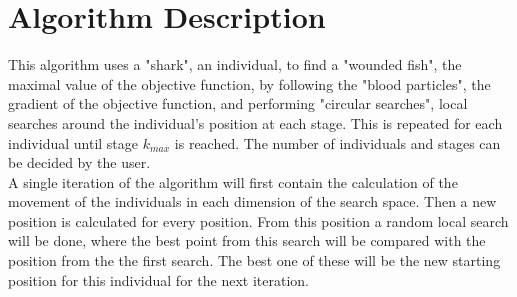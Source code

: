 \documentclass[runningheads]{llncs}
\begin{document}
\section{Algorithm Description} \label{sec:description}
This algorithm uses a "shark", an individual, to find a "wounded fish", the maximal value of the objective function, by following the "blood particles", the gradient of the objective function, and performing "circular searches", local searches around the individual's position at each stage. This is repeated for each individual until stage $k_{max}$ is reached. The number of individuals and stages can be decided by the user. \\
A single iteration of the algorithm will first contain the calculation of the movement of the individuals in each dimension of the search space. Then a new position is calculated for every position. From this position a random local search will be done, where the best point from this search will be compared with the position from the the first search. The best one of these will be the new starting position for this individual for the next iteration.
\\

\end{document}
